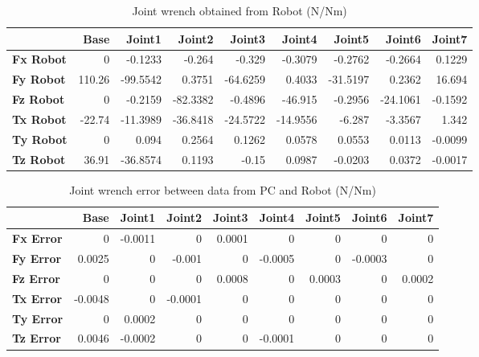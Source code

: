 \begin{table}[h!]
	\centering
	\caption{Joint wrench obtained from Robot (N/Nm)}
	\label{wrech_Robot_Pose15}
	\begin{tabular}{|l|r|r|r|r|r|r|r|r|}
		\hline
		\textbf{} & \textbf{Base} & \textbf{Joint1}  & \textbf{Joint2}  & \textbf{Joint3}  & \textbf{Joint4}  & \textbf{Joint5}  & \textbf{Joint6}  & \textbf{Joint7} \\ \hline
		\textbf{Fx Robot}  & 0        & -0.1233        & -0.264        & -0.329        & -0.3079        & -0.2762        & -0.2664        & 0.1229 \\ \hline
		\textbf{Fy Robot}  & 110.26        & -99.5542        & 0.3751        & -64.6259        & 0.4033        & -31.5197        & 0.2362        & 16.694 \\ \hline
		\textbf{Fz Robot}  & 0        & -0.2159        & -82.3382        & -0.4896        & -46.915        & -0.2956        & -24.1061        & -0.1592 \\ \hline
		\textbf{Tx Robot}  & -22.74        & -11.3989        & -36.8418        & -24.5722        & -14.9556        & -6.287        & -3.3567        & 1.342 \\ \hline
		\textbf{Ty Robot}  & 0        & 0.094        & 0.2564        & 0.1262        & 0.0578        & 0.0553        & 0.0113        & -0.0099 \\ \hline
		\textbf{Tz Robot}  & 36.91        & -36.8574        & 0.1193        & -0.15        & 0.0987        & -0.0203        & 0.0372        & -0.0017 \\ \hline
	\end{tabular}
\end{table}

\begin{table}[h!]
	\centering
	\caption{Joint wrench error between data from PC and Robot (N/Nm)}
	\label{wrech_Error_Pose15}
	\begin{tabular}{|l|r|r|r|r|r|r|r|r|}
		\hline
		\textbf{}  & \textbf{Base} & \textbf{Joint1}  & \textbf{Joint2}  & \textbf{Joint3}  & \textbf{Joint4}  & \textbf{Joint5}  & \textbf{Joint6}  & \textbf{Joint7} \\ \hline
		\textbf{Fx Error}  & 0        & -0.0011        & 0        & 0.0001        & 0        & 0        & 0        & 0 \\ \hline
		\textbf{Fy Error}  & 0.0025        & 0        & -0.001        & 0        & -0.0005        & 0        & -0.0003        & 0 \\ \hline
		\textbf{Fz Error}  & 0        & 0        & 0        & 0.0008        & 0        & 0.0003        & 0        & 0.0002 \\ \hline
		\textbf{Tx Error}  & -0.0048        & 0        & -0.0001        & 0        & 0        & 0        & 0        & 0 \\ \hline
		\textbf{Ty Error}  & 0        & 0.0002        & 0        & 0        & 0        & 0        & 0        & 0 \\ \hline
		\textbf{Tz Error}  & 0.0046        & -0.0002        & 0        & 0        & -0.0001        & 0        & 0        & 0 \\ \hline
	\end{tabular}
\end{table}

